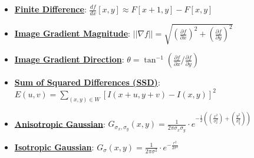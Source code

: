 \documentclass{article}%
\begin{document}
\begin{itemize}[leftmargin=*]%
\item \href{https://purdue.brightspace.com/d2l/common/assets/pdfjs-d2l-dist/1.0.14-legacy/web/viewer.html?file=%2Fcontent%2Fenforced%2F1095467-wl.202510.CS.24300.001%2F08L2-Feature Extraction.pdf%3Fou%3D1095467&lang=en-us&container=d2l-fileviewer-rendered-pdf&fullscreen=d2l-fileviewer-rendered-pdf-dialog&height=667#page=15}{\textbf{Finite Difference}}: $\frac{df}{dx} [x, y] \approx F[x + 1, y] - F[x, y]$%
\item \href{https://purdue.brightspace.com/d2l/common/assets/pdfjs-d2l-dist/1.0.14-legacy/web/viewer.html?file=%2Fcontent%2Fenforced%2F1095467-wl.202510.CS.24300.001%2F08L2-Feature Extraction.pdf%3Fou%3D1095467&lang=en-us&container=d2l-fileviewer-rendered-pdf&fullscreen=d2l-fileviewer-rendered-pdf-dialog&height=667#page=17}{\textbf{Image Gradient Magnitude}}: $||\nabla f|| = \sqrt{(\frac{\partial f}{\partial x})^2 + (\frac{\partial f}{\partial y})^2}$%
\item \href{https://purdue.brightspace.com/d2l/common/assets/pdfjs-d2l-dist/1.0.14-legacy/web/viewer.html?file=%2Fcontent%2Fenforced%2F1095467-wl.202510.CS.24300.001%2F08L2-Feature Extraction.pdf%3Fou%3D1095467&lang=en-us&container=d2l-fileviewer-rendered-pdf&fullscreen=d2l-fileviewer-rendered-pdf-dialog&height=667#page=34}{\textbf{Image Gradient Direction}}: $\theta = \tan^{-1}(\frac{\partial f}{\partial x} / \frac{\partial f}{\partial y})$%
\item \href{https://purdue.brightspace.com/d2l/common/assets/pdfjs-d2l-dist/1.0.14-legacy/web/viewer.html?file=%2Fcontent%2Fenforced%2F1095467-wl.202510.CS.24300.001%2F08L2-Feature Extraction.pdf%3Fou%3D1095467&lang=en-us&container=d2l-fileviewer-rendered-pdf&fullscreen=d2l-fileviewer-rendered-pdf-dialog&height=667#page=25}{\textbf{Sum of Squared Differences (SSD)}}: $E(u, v) = \sum_{(x,y) \in W} [I(x + u, y + v) - I(x, y)]^2$%
\item \href{https://purdue.brightspace.com/d2l/common/assets/pdfjs-d2l-dist/1.0.14-legacy/web/viewer.html?file=%2Fcontent%2Fenforced%2F1095467-wl.202510.CS.24300.001%2F08L2-Feature Extraction.pdf%3Fou%3D1095467&lang=en-us&container=d2l-fileviewer-rendered-pdf&fullscreen=d2l-fileviewer-rendered-pdf-dialog&height=667#page=43}{\textbf{Anisotropic Gaussian}}: $G_{\sigma_x, \sigma_y}(x, y) = \frac{1}{2\pi\sigma_x\sigma_y} \cdot e^{-\frac{1}{2}((\frac{x^2}{\sigma_x^2}) + (\frac{y^2}{\sigma_y^2}))}$%
\item \href{https://purdue.brightspace.com/d2l/common/assets/pdfjs-d2l-dist/1.0.14-legacy/web/viewer.html?file=%2Fcontent%2Fenforced%2F1095467-wl.202510.CS.24300.001%2F08L2-Feature Extraction.pdf%3Fou%3D1095467&lang=en-us&container=d2l-fileviewer-rendered-pdf&fullscreen=d2l-fileviewer-rendered-pdf-dialog&height=667#page=43}{\textbf{Isotropic Gaussian}}: $G_\sigma(x, y) = \frac{1}{2\pi\sigma^2} \cdot e^{-\frac{r^2}{2\sigma^2}}$%
\end{itemize}%
\end{document}
